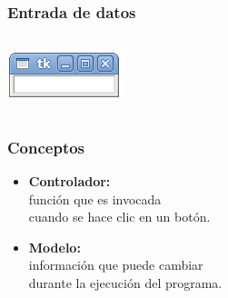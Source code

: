 \documentclass[12pt]{beamer}
\begin{document}
  \begin{frame}
    \label{entrada}
    \frametitle{Entrada de datos}
    \begin{columns}[B]
        \footnotesize
        
        \vspace{20ex}
        \includegraphics[width=\textwidth]{programas/tkinter/capturas/entrada.png}
    \end{columns}
  \end{frame}

  \begin{frame}
    \label{resumen-conceptos}
    \frametitle{Conceptos}
    \begin{itemize}
      \Large
      \item \textbf{Controlador:} \\
        función que es invocada \\
        cuando se hace clic en un botón.
      \item \textbf{Modelo:} \\
        información que puede cambiar \\
        durante la ejecución del programa.
    \end{itemize}
  \end{frame}
\end{document}
